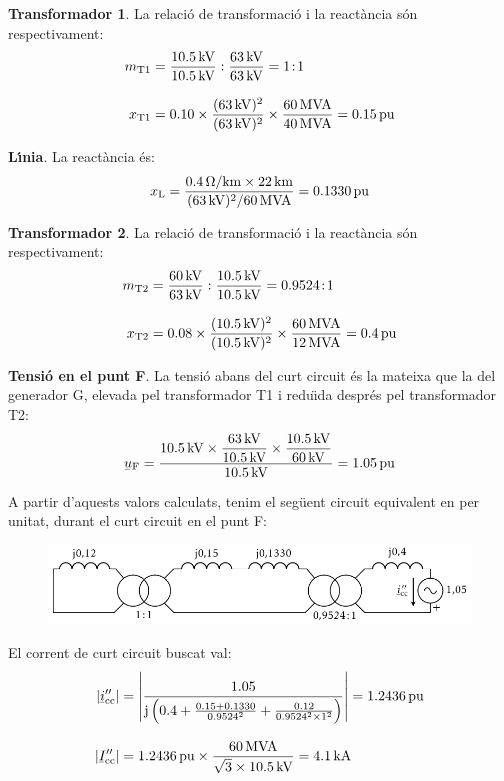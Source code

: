 \begin{exemple}
\textbf{Transformador 1}. La relaci\'{o} de transformaci\'{o} i la react\`{a}ncia s\'{o}n respectivament:
\begin{align*}
m_\mathrm{T1} &= \frac{\SI{10,5}{kV}}{\SI{10,5}{kV}} :
\frac{\SI{63}{kV}}{\SI{63}{kV}} = 1\!:\!1 \\[3mm]
x_\mathrm{T1} &= \num{0,10} \times \frac{(\SI{63}{kV})^2}{(\SI{63}{kV})^2} \times
\frac{\SI{60}{MVA}}{\SI{40}{MVA}}  = \SI{0,15}{pu}
\end{align*}

\textbf{L\'{\i}nia}. La react\`{a}ncia \'{e}s:
\[
x_\mathrm{L} = \frac{\SI{0,4}{\ensuremath{\mathrm{\Omega}}/km} \times \SI{22}{km}} {(\SI{63}{kV})^2/\SI{60}{MVA}}  =
\SI{0,1330}{pu}
\]

\textbf{Transformador 2}. La relaci\'{o} de transformaci\'{o} i la react\`{a}ncia s\'{o}n respectivament:
\begin{align*}
m_\mathrm{T2} &= \frac{\SI{60}{kV}}{\SI{63}{kV}} :
\frac{\SI{10,5}{kV}}{\SI{10,5}{kV}} = \num{0,9524}\!:\!1 \\[3mm]
x_\mathrm{T2} &= \num{0,08} \times \frac{(\SI{10,5}{kV})^2}{(\SI{10,5}{kV})^2} \times
\frac{\SI{60}{MVA}}{\SI{12}{MVA}}  = \SI{0,4}{pu}
\end{align*}


\textbf{Tensi\'{o} en el punt F}. La tensi\'{o} abans del curt circuit \'{e}s la mateixa que la del generador G, elevada pel transformador T1 i redu\"{\i}da despr\'{e}s pel transformador T2:
\[
\cmplx{u}\ped{F} = \frac{\SI{10,5}{kV} \times
\dfrac{\SI{63}{kV}}{\SI{10,5}{kV}} \times
\dfrac{\SI{10,5}{kV}}{\SI{60}{kV}}}{\SI{10,5}{kV}} = \SI{1,05}{pu}
\]

A partir d'aquests valors calculats, tenim el seg\"{u}ent circuit equivalent en per unitat, durant el
curt circuit en el punt F:

\begin{figure}[h]
\centering
   \includegraphics{Imatges/Cap-Fonaments-pu-Circuit2.pdf}
\end{figure}

El corrent de curt circuit buscat val:
\begin{align*}
|\cmplx{i}''\ped{cc}| &= \left| \frac{\num{1,05}}{\ju \left( \num{0,4} + \frac{\num{0,15} + \num{0,1330}}{\num{0,9524}^2} + \frac{\num{0,12}}{\num{0,9524}^2 \times 1^2} \right)} \right| =
 \SI{1,2436}{pu} \\[3mm]
 |\cmplx{I}''\ped{cc}| &= \SI{1,2436}{pu}\times\frac{\SI{60}{MVA}}{\sqrt{3}\times \SI{10,5}{kV}} =
 \SI{4,1}{kA}
\end{align*}


\end{exemple}
